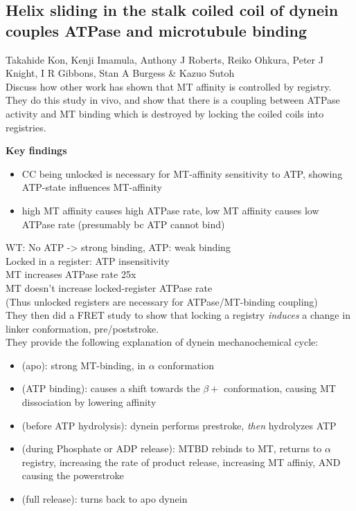 \documentclass[10pt]{article} %
\begin{document}
\subsection{Helix sliding in the stalk coiled coil of dynein couples ATPase and microtubule binding}
Takahide Kon, Kenji Imamula, Anthony J Roberts, Reiko Ohkura, Peter J Knight, I R Gibbons, Stan A Burgess \& Kazuo Sutoh\\
Discuss how other work has shown that MT affinity is controlled by registry. They do this study in vivo, and show that there is a coupling between ATPase activity and MT binding which is destroyed by locking the coiled coils into registries.

\textbf{Key findings}
\begin{itemize}
\item CC being unlocked is necessary for MT-affinity sensitivity to ATP, showing ATP-state influences MT-affinity
\item high MT affinity causes high ATPase rate, low MT affinity causes low ATPase rate (presumably bc ATP cannot bind)
\end{itemize}

WT: No ATP -> strong binding, ATP: weak binding\\
Locked in a register: ATP insensitivity\\
MT increases ATPase rate 25x\\
MT doesn't increase locked-register ATPase rate\\
(Thus unlocked registers are necessary for ATPase/MT-binding coupling)\\

They then did a FRET study to show that locking a registry \textit{induces} a change in linker conformation, pre/poststroke.\\

They provide the following explanation of dynein mechanochemical cycle:

\begin{itemize}
\item (apo): strong MT-binding, in $\alpha$ conformation
\item (ATP binding): causes a shift towards the $\beta+$ conformation, causing MT dissociation by lowering affinity
\item (before ATP hydrolysis): dynein performs prestroke, \textit{then} hydrolyzes ATP
\item (during Phosphate or ADP release): MTBD rebinds to MT, returns to $\alpha$ registry, increasing the rate of product release, increasing MT affiniy, AND causing the powerstroke
\item (full release): turns back to apo dynein
\end{itemize}
\end{document}
